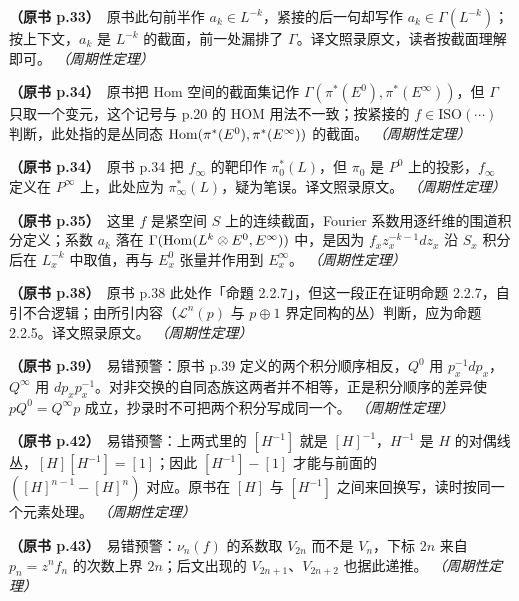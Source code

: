 \noindent \textbf{（原书 p.33）}\ 原书此句前半作 $a_k\in L^{-k}$，紧接的后一句却写作 $a_k\in\Gamma(L^{-k})$；按上下文，$a_k$ 是 $L^{-k}$ 的截面，前一处漏排了 $\Gamma$。译文照录原文，读者按截面理解即可。 \textit{（周期性定理）}\par\smallskip

\noindent \textbf{（原书 p.34）}\ 原书把 Hom 空间的截面集记作 $\Gamma(\pi^{*}(E^0),\pi^{*}(E^\infty))$，但 $\Gamma$ 只取一个变元，这个记号与 p.20 的 $\mathrm{HOM}$ 用法不一致；按紧接的 $f\in\mathrm{ISO}(\cdots)$ 判断，此处指的是丛同态 $\operatorname{Hom}(\pi^{*}(E^0),\pi^{*}(E^\infty))$ 的截面。 \textit{（周期性定理）}\par\smallskip

\noindent \textbf{（原书 p.34）}\ 原书 p.34 把 $f_\infty$ 的靶印作 $\pi_0^*(L)$，但 $\pi_0$ 是 $P^0$ 上的投影，$f_\infty$ 定义在 $P^\infty$ 上，此处应为 $\pi_\infty^*(L)$，疑为笔误。译文照录原文。 \textit{（周期性定理）}\par\smallskip

\noindent \textbf{（原书 p.35）}\ 这里 $f$ 是紧空间 $S$ 上的连续截面，Fourier 系数用逐纤维的围道积分定义；系数 $a_k$ 落在 $\Gamma(\operatorname{Hom}(L^k\otimes E^0,E^\infty))$ 中，是因为 $f_xz_x^{-k-1}dz_x$ 沿 $S_x$ 积分后在 $L_x^{-k}$ 中取值，再与 $E^0_x$ 张量并作用到 $E^\infty_x$。 \textit{（周期性定理）}\par\smallskip

\noindent \textbf{（原书 p.38）}\ 原书 p.38 此处作「命題 2.2.7」，但这一段正在证明命题 2.2.7，自引不合逻辑；由所引内容（$\mathcal{L}^n(p)$ 与 $p\oplus1$ 界定同构的丛）判断，应为命题 2.2.5。译文照录原文。 \textit{（周期性定理）}\par\smallskip

\noindent \textbf{（原书 p.39）}\ 易错预警：原书 p.39 定义的两个积分顺序相反，$Q^0$ 用 $p_x^{-1}dp_x$，$Q^\infty$ 用 $dp_xp_x^{-1}$。对非交换的自同态族这两者并不相等，正是积分顺序的差异使 $pQ^0=Q^\infty p$ 成立，抄录时不可把两个积分写成同一个。 \textit{（周期性定理）}\par\smallskip

\noindent \textbf{（原书 p.42）}\ 易错预警：上两式里的 $[H^{-1}]$ 就是 $[H]^{-1}$，$H^{-1}$ 是 $H$ 的对偶线丛，$[H][H^{-1}]=[1]$；因此 $[H^{-1}]-[1]$ 才能与前面的 $([H]^{n-1}-[H]^n)$ 对应。原书在 $[H]$ 与 $[H^{-1}]$ 之间来回换写，读时按同一个元素处理。 \textit{（周期性定理）}\par\smallskip

\noindent \textbf{（原书 p.43）}\ 易错预警：$\nu_n(f)$ 的系数取 $V_{2n}$ 而不是 $V_n$，下标 $2n$ 来自 $p_n=z^nf_n$ 的次数上界 $2n$；后文出现的 $V_{2n+1}$、$V_{2n+2}$ 也据此递推。 \textit{（周期性定理）}\par\smallskip

